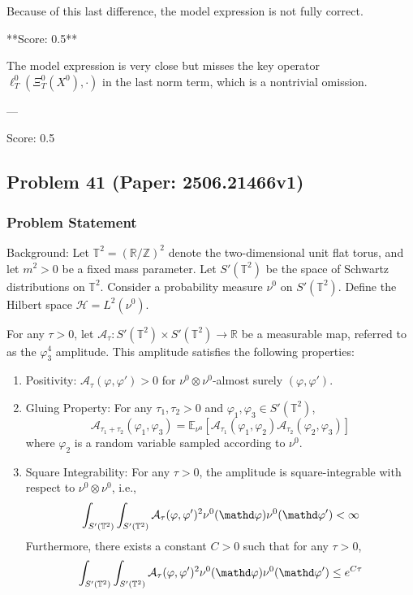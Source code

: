 \documentclass[10pt]{article}
\begin{document}
Because of this last difference, the model expression is not fully correct.

**Score: 0.5**

The model expression is very close but misses the key operator \(\ell^0_T(\Xi^0_T(X^0), \cdot)\) in the last norm term, which is a nontrivial omission.

---

Score: 0.5

\newpage
\subsection*{Problem 41 (Paper: 2506.21466v1)}
\subsubsection*{Problem Statement}
Background:  
Let $\mathbb{T}^2 = (\mathbb{R}/\mathbb{Z})^2$ denote the two-dimensional unit flat torus, and let $m^2 > 0$ be a fixed mass parameter. Let $S'(\mathbb{T}^2)$ be the space of Schwartz distributions on $\mathbb{T}^2$. Consider a probability measure $\nu^0$ on $S'(\mathbb{T}^2)$. Define the Hilbert space $\mathcal{H} = L^2(\nu^0)$.

For any $\tau > 0$, let $\mathcal{A}_\tau: S'(\mathbb{T}^2) \times S'(\mathbb{T}^2) \rightarrow \mathbb{R}$ be a measurable map, referred to as the $\varphi^4_3$ amplitude. This amplitude satisfies the following properties:
\begin{enumerate}
    \item Positivity: $\mathcal{A}_\tau(\varphi, \varphi') > 0$ for $\nu^0 \otimes \nu^0$-almost surely $(\varphi, \varphi')$.
    \item Gluing Property: For any $\tau_1, \tau_2 > 0$ and $\varphi_1, \varphi_3 \in S'(\mathbb{T}^2)$,
    $$ \mathcal{A}_{\tau_1+\tau_2}(\varphi_1, \varphi_3) = \mathbb{E}_{\nu^0}[\mathcal{A}_{\tau_1}(\varphi_1, \varphi_2) \mathcal{A}_{\tau_2}(\varphi_2, \varphi_3)] $$
    where $\varphi_2$ is a random variable sampled according to $\nu^0$.
    \item Square Integrability: For any $\tau > 0$, the amplitude is square-integrable with respect to $\nu^0 \otimes \nu^0$, i.e.,
    $$ \int_{S'(\mathbb{T}^2)} \int_{S'(\mathbb{T}^2)} \mathcal{A}_\tau(\varphi, \varphi')^2 \nu^0(\mathd\varphi) \nu^0(\mathd\varphi') < \infty $$
    Furthermore, there exists a constant $C > 0$ such that for any $\tau > 0$,
    $$ \int_{S'(\mathbb{T}^2)} \int_{S'(\mathbb{T}^2)} \mathcal{A}_\tau(\varphi, \varphi')^2 \nu^0(\mathd\varphi) \nu^0(\mathd\varphi') \leq e^{C\tau} $$
\end{enumerate}
\end{document}
